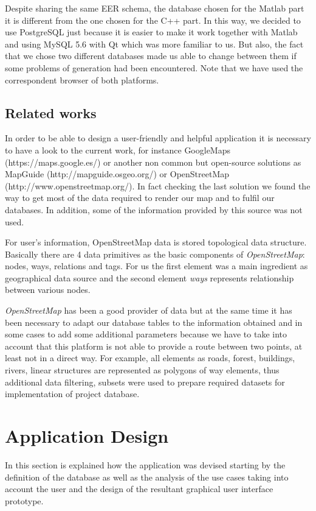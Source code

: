 \documentclass{article}
\begin{document}
Despite sharing the same EER schema, the database chosen for the Matlab part it is different from the one chosen for the C++ part. In this way, we decided to use PostgreSQL just because it is easier to make it work together with Matlab and using MySQL 5.6 with Qt which was more familiar to us. But also, the fact that we chose two different databases made us able to change between them if some problems of generation had been encountered. Note that we have used the correspondent browser of both platforms.

\subsection{Related works}

In order to be able to design a user-friendly and helpful application it is necessary to have a look to the current work, for instance GoogleMaps (https://maps.google.es/) or another non common but open-source solutions as MapGuide (http://mapguide.osgeo.org/) or OpenStreetMap (http://www.openstreetmap.org/). In fact checking the last solution we found the way to get most of the data required to render our map and to fulfil our databases. In addition, some of the information provided by this source was not used.

For user's information, OpenStreetMap data is stored topological data structure. Basically there are 4 data primitives as the basic components of \textit{OpenStreetMap}: nodes, ways, relations and tags. For us the first element was a main ingredient as geographical data source and the second element \textit{ways} represents relationship between various nodes. 

\textit{OpenStreetMap} has been a good provider of data but at the same time it has been necessary to adapt our database tables to the information obtained and in some cases to add some additional parameters because we have to take into account that this platform is not able to provide a route between two points, at least not in a direct way. For example, all elements as roads, forest, buildings, rivers, linear structures are represented as polygons of way elements, thus additional data filtering, subsets were used to prepare required datasets for implementation of project database.



\section{Application Design}
In this section is explained how the application was devised starting by the definition of the database as well as the analysis of the use cases taking into account the user and the design of the resultant graphical user interface prototype.
\end{document}
